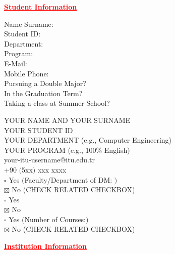\documentclass[12pt]{article}
\makeatletter
\newcommand{\name}{YOUR NAME AND YOUR SURNAME}
\newcommand{\id}{YOUR STUDENT ID}
\newcommand{\mail}{your-itu-username@itu.edu.tr}
\makeatother
\begin{document}
{\centering
  \textcolor{red}{\bfseries \ul{ Student Information}}
  \\[1\baselineskip]
  \par}
\begin{minipage}[t]{.3\textwidth}
  \vspace{0pt}
  \begin{flushright}
  Name Surname: \\
  Student ID: \\
  Department: \\
  Program: \\ 
  E-Mail: \\
  Mobile Phone: \\
  Pursuing a Double Major?\\[2\baselineskip]
  In the Graduation Term? \\[1\baselineskip]
  Taking a class at Summer School? \\
  \end{flushright}
\end{minipage}%
\hspace{0.5cm}
\begin{minipage}[t]{.7\textwidth}
  \vspace{0pt}
  \name\\
  \id\\
  YOUR DEPARTMENT (e.g., Computer Engineering) \\
  YOUR PROGRAM (e.g., 100\% English) \\
  \mail\\
  +90 $($5xx$)$ xxx xxxx \\
  $\square$ Yes $($Faculty/Department of DM: \underline{\hspace{3cm}}$)$ \\
  $\boxtimes$ No (CHECK RELATED CHECKBOX) \\[1\baselineskip]
  $\square$ Yes \\
  $\boxtimes$ No \\[1\baselineskip]
  $\square$ Yes $($Number of Courses:\underline{\hspace{1cm}}$)$ \\
  $\boxtimes$ No (CHECK RELATED CHECKBOX)\\
\end{minipage}

\vspace{75pt}

{\centering
  \textcolor{red}{\bfseries \ul{Institution Information}}
  \\[1\baselineskip]
  \par}
\end{document}
